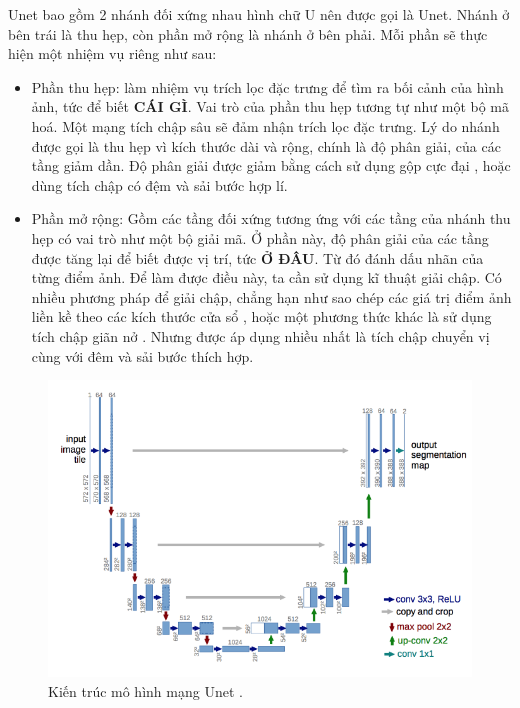 \documentclass[a4paper, 12pt]{report}
\begin{document}
Unet bao gồm 2 nhánh đối xứng nhau hình chữ U nên được gọi là Unet.
Nhánh ở bên trái là thu hẹp, còn phần mở rộng là nhánh ở bên phải.
Mỗi phần sẽ thực hiện một nhiệm vụ riêng như sau:

\begin{itemize}
    \item Phần thu hẹp: làm nhiệm vụ trích lọc đặc trưng để tìm ra bối cảnh của hình ảnh, tức để biết \textbf{CÁI GÌ}.
    Vai trò của phần thu hẹp tương tự như một bộ mã hoá.
    Một mạng tích chập sâu sẽ đảm nhận trích lọc đặc trưng.
    Lý do nhánh được gọi là thu hẹp vì kích thước dài và rộng, chính là độ phân giải, của các tầng giảm dần.
    Độ phân giải được giảm bằng cách sử dụng gộp cực đại \cite{wikimaxpooling2021}, hoặc dùng tích chập có đệm và sải bước hợp lí.
    
    \item Phần mở rộng: Gồm các tầng đối xứng tương ứng với các tầng của nhánh thu hẹp có vai trò như một bộ giải mã.
    Ở phần này, độ phân giải của các tầng được tăng lại để biết được vị trí, tức \textbf{Ở ĐÂU}.
    Từ đó đánh dấu nhãn của từng điểm ảnh.
    Để làm được điều này, ta cần sử dụng kĩ thuật giải chập.
    Có nhiều phương pháp để giải chập, chẳng hạn như sao chép các giá trị điểm ảnh liền kề theo các kích thước cửa sổ \cite{khanhunet2020}, hoặc một phương thức khác là sử dụng tích chập giãn nở \cite{yu2016multiscale}.
    Nhưng được áp dụng nhiều nhất là tích chập chuyển vị \cite{divyanshutransconv2020} cùng với đêm và sải bước thích hợp.
\end{itemize}

\begin{figure}[!h]
\captionsetup{width=0.8\textwidth}
\centering
\includegraphics[width=15cm]{images/2_8.png}
\caption{Kiến trúc mô hình mạng Unet \cite{ronneberger2015unet}.}
\end{figure}
\end{document}
